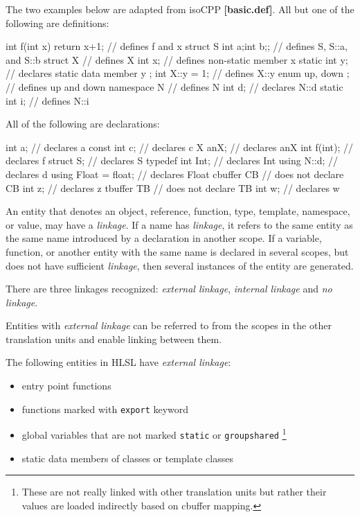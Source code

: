 \p The two examples below are adapted from \gls{isoCPP} \textbf{[basic.def]}. All
but one of the following are definitions:
\begin{HLSL}
int f(int x) { return x+1; } // defines f and x
struct S {int a;int b;};     // defines S, S::a, and S::b
struct X {                   // defines X
  int x;                     // defines non-static member x
  static int y;              // declares static data member y
};
int X::y = 1;                // defines X::y
enum { up, down };           // defines up and down
namespace N {                // defines N
int d;                       // declares N::d
static int i;                // defines N::i
}
\end{HLSL}

\p All of the following are declarations:
\begin{HLSL}
int a;                       // declares a
const int c;                 // declares c
X anX;                       // declares anX
int f(int);                  // declares f
struct S;                    // declares S
typedef int Int;             // declares Int
using N::d;                  // declares d
using Float = float;         // declares Float
cbuffer CB {                 // does not declare CB
  int z;                     // declares z
}
tbuffer TB {                 // does not declare TB
  int w;                     // declares w
}
\end{HLSL}


\p An entity that denotes an object, reference, function, type, template,
namespace, or value, may have a \textit{linkage}. If a name has
\textit{linkage}, it refers to the same entity as the same name introduced by a
declaration in another scope. If a variable, function, or another entity with
the same name is declared in several scopes, but does not have sufficient
\textit{linkage}, then several instances of the entity are generated.

\p There are three linkages recognized: \textit{external linkage},
\textit{internal linkage} and \textit{no linkage}.


\p Entities with \textit{external linkage} can be referred to from the scopes in
the other translation units and enable linking between them.

\p The following entities in HLSL have \textit{external linkage}:
\begin{itemize}
  \item entry point functions
  \item functions marked with \texttt{export} keyword
  \item global variables that are not marked \texttt{static} or
  \texttt{groupshared} \footnote{These are not really linked with other
  translation units but rather their values are loaded indirectly based on
  cbuffer mapping.}
  \item static data members of classes or template classes
\end{itemize}

